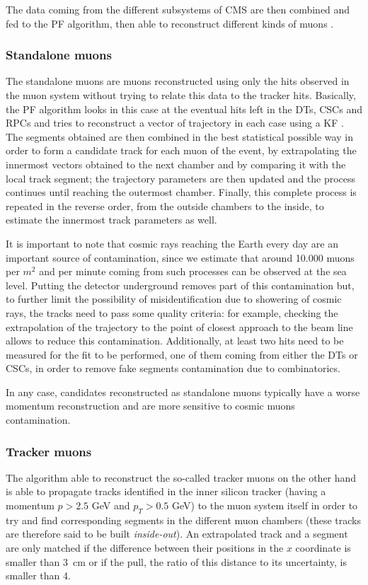 \documentclass[a4paper, 10pt, openright]{report}
\begin{document}
The data coming from the different subsystems of \ac{CMS} are then combined and fed to the \ac{PF} algorithm, then able to reconstruct different kinds of muons \cite{MuonSystemsEff}.

\subsubsection*{Standalone muons}
The standalone muons are muons reconstructed using only the hits observed in the muon system without trying to relate this data to the tracker hits. Basically, the \ac{PF} algorithm looks in this case at the eventual hits left in the \acp{DT}, \acp{CSC} and \acp{RPC} and tries to reconstruct a vector of trajectory in each case using a \ac{KF} \cite{KF}. The segments obtained are then combined in the best statistical possible way in order to form a candidate track for each muon of the event, by extrapolating the innermost vectors obtained to the next chamber and by comparing it with the local track segment; the trajectory parameters are then updated and the process continues until reaching the outermost chamber. Finally, this complete process is repeated in the reverse order, from the outside chambers to the inside, to estimate the innermost track parameters as well.

It is important to note that cosmic rays reaching the Earth every day are an important source of contamination, since we estimate that around 10.000 muons per $m^2$ and per minute coming from such processes can be observed at the sea level. Putting the detector underground removes part of this contamination but, to further limit the possibility of misidentification due to showering of cosmic rays, the tracks need to pass some quality criteria: for example, checking the extrapolation of the trajectory to the point of closest approach to the beam line allows to reduce this contamination. Additionally, at least two hits need to be measured for the fit to be performed, one of them coming from either the \acp{DT} or \acp{CSC}, in order to remove fake segments contamination due to combinatorics.

In any case, candidates reconstructed as standalone muons typically have a worse momentum reconstruction and are more sensitive to cosmic muons contamination.  

\subsubsection*{Tracker muons}
The algorithm able to reconstruct the so-called tracker muons on the other hand is able to propagate tracks identified in the inner silicon tracker (having a momentum $p > 2.5$ GeV and $p_T > 0.5$ GeV) to the muon system itself in order to try and find corresponding segments in the different muon chambers (these tracks are therefore said to be built \textit{inside-out}). An extrapolated track and a segment are only matched if the difference between their positions in the $x$ coordinate is smaller than 3~cm or if the pull, the ratio of this distance to its uncertainty, is smaller than 4.
\end{document}

